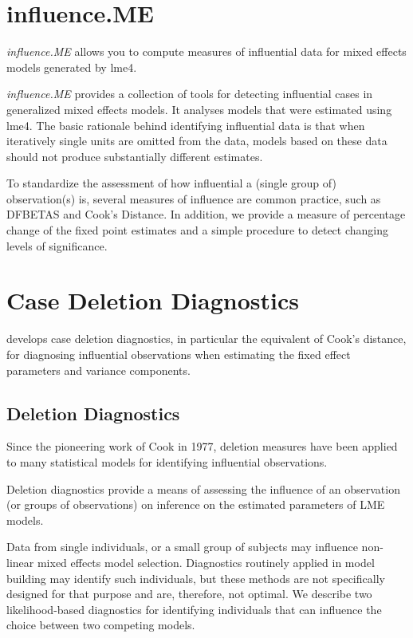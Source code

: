 \documentclass[Main.tex]{subfiles}
\begin{document}
	\section{influence.ME}
	
	\textit{influence.ME} allows you to compute measures of influential data for mixed effects models generated by lme4.
	
	\textit{influence.ME} provides a collection of tools for detecting influential cases in generalized mixed effects models. It analyses models that were estimated using lme4. The basic rationale behind identifying influential data is that when iteratively single units are omitted from the data, models based on these data should not produce substantially different estimates. 
	
	To standardize the assessment of how influential a (single group of) observation(s) is, several measures of influence are common practice, such as DFBETAS and Cook's Distance. In addition, we provide a measure of percentage change of the fixed point estimates and a simple procedure to detect changing levels of significance.
\newpage
\section{Case Deletion Diagnostics} %

\citet{CPJ} develops  case deletion diagnostics, in particular the equivalent of  Cook's distance, for diagnosing influential observations when estimating the fixed effect parameters and variance components.

\subsection{Deletion Diagnostics}

Since the pioneering work of Cook in 1977, deletion measures have been applied to many statistical models for identifying influential observations.

Deletion diagnostics provide a means of assessing the influence of an observation (or groups of observations) on inference on the estimated parameters of LME models.

Data from single individuals, or a small group of subjects may influence non-linear mixed effects model selection. Diagnostics routinely applied in model building may identify such individuals, but these methods are not specifically designed for that purpose and are, therefore, not optimal. We describe two likelihood-based diagnostics for identifying individuals that can influence the choice between two competing models.
\end{document}
